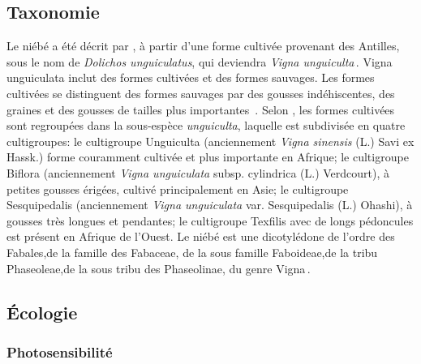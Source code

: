\documentclass[a4paper,11pt]{article}
\begin{document}
\subsection{Taxonomie}

Le niébé a été décrit par , à partir d’une forme cultivée
provenant des Antilles, sous le nom de \emph{Dolichos unguiculatus},
qui deviendra \emph{Vigna unguiculta}\,\cite{Pasquet_1997}. Vigna
unguiculata inclut des formes cultivées et des formes sauvages. Les
formes cultivées se distinguent des formes sauvages par des gousses
indéhiscentes, des graines et des gousses de tailles plus importantes
\,\cite{Lush_1981}. Selon\,\citeauthor{Vanderborght_2001}\,\citeyear{Vanderborght_2001},
les formes cultivées sont regroupées dans la sous-espèce
\emph{unguiculta}, laquelle est subdivisée en quatre cultigroupes: le
cultigroupe Unguiculta (anciennement \emph{ Vigna sinensis} (L.) Savi
ex Hassk.)  forme couramment cultivée et plus importante en Afrique;
le cultigroupe Biflora (anciennement \emph{Vigna unguiculata}
subsp. cylindrica (L.) Verdcourt), à petites gousses érigées, cultivé
principalement en Asie; le cultigroupe Sesquipedalis (anciennement
\emph{Vigna unguiculata} var. Sesquipedalis (L.) Ohashi), à gousses
très longues et pendantes; le cultigroupe Texfilis avec de longs
pédoncules est présent en Afrique de l’Ouest. Le niébé est une
dicotylédone de l’ordre des Fabales,de la famille des Fabaceae, de la
sous famille Faboideae,de la tribu Phaseoleae,de la sous tribu des
Phaseolinae, du genre Vigna\,\cite{Verdcourt_1970, Marechal_1978}.

\subsection{Écologie}

\subsubsection{Photosensibilité}
\end{document}
